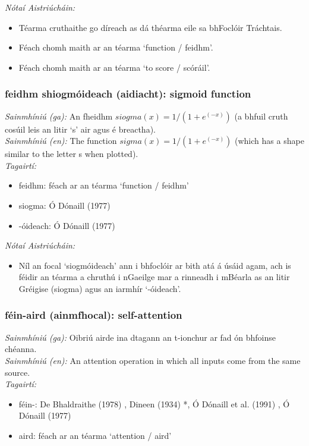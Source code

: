  \noindent \textit{Nótaí Aistriúcháin:}
\begin{itemize}
	\item Téarma cruthaithe go díreach as dá théarma eile sa bhFoclóir Tráchtais.
	\item Féach chomh maith ar an téarma `function / feidhm'.
	\item Féach chomh maith ar an téarma `to score / scóráil'.
\end{itemize}


\subsubsection*{feidhm shiogmóideach (aidiacht): sigmoid function}
 \noindent \textit{Sainmhíniú (ga):} An fheidhm $siogma(x) = 1 / (1 + e^(-x))$ (a bhfuil cruth cosúil leis an litir `s' air agus é breactha).
\\
 \noindent \textit{Sainmhíniú (en):} The function $sigma(x) = 1 / (1 + e^(-x))$ (which has a shape similar to the letter s when plotted).
\\
 \noindent \textit{Tagairtí:}
\begin{itemize}
	\item feidhm: féach ar an téarma `function / feidhm'
	\item siogma: Ó Dónaill (1977) \cite{odonaill}
	\item -óideach: Ó Dónaill (1977) \cite{odonaill}
\end{itemize}

 \noindent \textit{Nótaí Aistriúcháin:}
\begin{itemize}
	\item Níl an focal `siogmóideach' ann i bhfoclóir ar bith atá á úsáid agam, ach is féidir an téarma a chruthú i nGaeilge mar a rinneadh i mBéarla as an litir Gréigise (siogma) agus an iarmhír `-óideach'.
\end{itemize}


\subsubsection*{féin-aird (ainmfhocal): self-attention}
 \noindent \textit{Sainmhíniú (ga):} Oibriú airde ina dtagann an t-ionchur ar fad ón bhfoinse chéanna.
\\
 \noindent \textit{Sainmhíniú (en):} An attention operation in which all inputs come from the same source.
\\
 \noindent \textit{Tagairtí:}
\begin{itemize}
	\item féin-: De Bhaldraithe (1978) \cite{de-bhaldraithe}, Dineen (1934) \cite{dineen}*, Ó Dónaill et al. (1991) \cite{focloir-beag}, Ó Dónaill (1977) \cite{odonaill}
	\item aird: féach ar an téarma `attention / aird'
\end{itemize}

